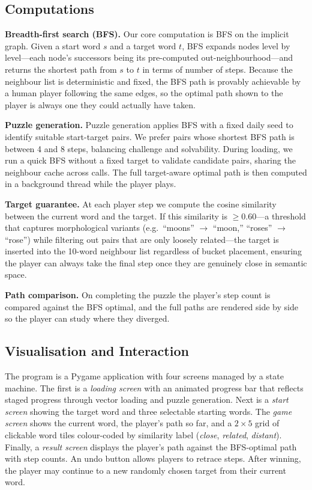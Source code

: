 \documentclass[11pt]{article}
\begin{document}
\subsection*{Computations}

\textbf{Breadth-first search (BFS).}
Our core computation is BFS on the implicit graph.  Given a start word $s$ and a
target word $t$, BFS expands nodes level by level---each node's successors being
its pre-computed out-neighbourhood---and returns the shortest path from $s$ to
$t$ in terms of number of steps.  Because the neighbour list is deterministic
and fixed, the BFS path is provably achievable by a human player following the
same edges, so the optimal path shown to the player is always one they could
actually have taken.

\textbf{Puzzle generation.}
Puzzle generation applies BFS with a fixed daily seed to identify suitable
start-target pairs.  We prefer pairs whose shortest BFS path is between 4 and 8
steps, balancing challenge and solvability.  During loading, we run a quick BFS
without a fixed target to validate candidate pairs, sharing the neighbour cache
across calls. The full target-aware optimal path is then computed in a background
thread while the player plays.

\textbf{Target guarantee.}
At each player step we compute the cosine similarity between the current word
and the target.  If this similarity is $\geq 0.60$---a threshold that captures
morphological variants (e.g.\ ``moons'' $\to$ ``moon,'' ``roses'' $\to$
``rose'') while filtering out pairs that are only loosely related---the target
is inserted into the 10-word neighbour list regardless of bucket placement,
ensuring the player can always take the final step once they are genuinely close
in semantic space.

\textbf{Path comparison.}
On completing the puzzle the player's step count is compared against the BFS
optimal, and the full paths are rendered side by side so the player can study
where they diverged.

\subsection*{Visualisation and Interaction}

The program is a Pygame application with four screens managed by a state
machine. The first is a \emph{loading screen} with an animated progress bar
that reflects staged progress through vector loading and puzzle generation.
Next is a \emph{start screen} showing the target word and three selectable
starting words. The \emph{game screen} shows the current word, the player's
path so far, and a $2 \times 5$ grid of clickable word tiles colour-coded by
similarity label (\emph{close}, \emph{related}, \emph{distant}). Finally, a
\emph{result screen} displays the player's path against the BFS-optimal path
with step counts.  An undo button allows players to retrace steps.  After
winning, the player may continue to a new randomly chosen target from their
current word.
\end{document}
